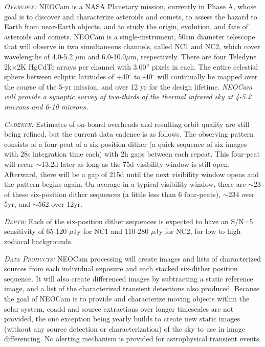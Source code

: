 \documentclass[12pt]{article}
\begin{document}
\textsl{\textsc{Overview:}}
NEOCam is a NASA Planetary mission, currently in Phase A, whose goal
is to discover and characterize asteroids and comets, to assess the
hazard to Earth from near-Earth objects, and to study the origin,
evolution, and fate of asteroids and comets. NEOCam is a
single-instrument, 50cm diameter telescope that will observe in two
simultaneous channels, called NC1 and NC2, which cover wavelengths of
4.0-5.2 $\mu$m and 6.0-10.0$\mu$m, respectively. There are four Teledyne
2k$\times$2K HgCdTe arrays per channel with 3.00'' pixels in each. The entire
celestial sphere between ecliptic latitudes of +40$^{\circ}$ to -40$^{\circ}$ will
continually be mapped over the course of the 5-yr mission, and over 12
yr for the design lifetime. 
{\it NEOCam will provide a synoptic survey of two-thirds of the thermal infrared sky at 4-5.2 microns and 6-10 microns.}

\smallskip
\smallskip
\noindent
\textsl{\textsc{Cadence:}} Estimates of on-board overheads and resulting orbit quality are still being refined, but the current data cadence is as follows. The observing pattern consists of a four-peat of a six-position dither (a quick sequence of six images with 28s integration time each) with 2h gaps between each repeat. This four-peat will recur $\sim$13.2d later as long as the 75d visibility window is still open. Afterward, there will be a gap of 215d until the next visibility window opens and the pattern begins again. On average in a typical visibility window, there are $\sim$23 of these six-position dither sequences (a little less than 6 four-peats), $\sim$234 over 5yr, and $\sim$562 over 12yr.

\smallskip
\smallskip
\noindent
\textsl{\textsc{Depth:}} Each of the six-position dither sequences is expected to have an S/N=5 sensitivity of 65-120 $\mu$Jy for NC1 and 110-280 $\mu$Jy for NC2, for low to high zodiacal backgrounds. 

\smallskip
\smallskip
\noindent
\textsl{\textsc{Data Products:}} NEOCam processing will create images and lists of characterized sources from each individual exposure and each stacked six-dither position sequence. It will also create differenced images by subtracting a static reference image, and a list of the characterized transient detections also produced. Because the goal of NEOCam is to provide and characterize moving objects within the solar system, coadd and source extractions over longer timescales are not provided, the one exception being yearly builds to create new static images (without any source detection or characterization) of the sky to use in image differencing. No alerting mechanism is provided for astrophysical transient events.  
\end{document}
